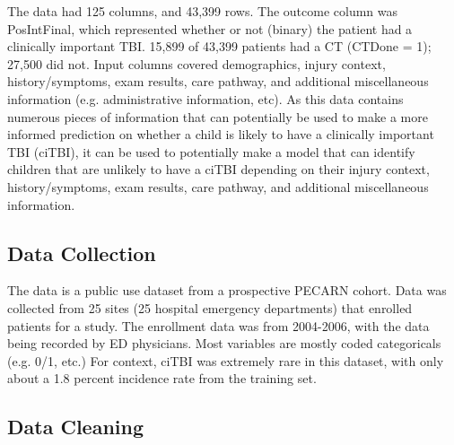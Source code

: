 \documentclass[10pt,letterpaper]{article}
\begin{document}
The data had 125 columns, and 43,399 rows. The outcome column was PosIntFinal, which represented whether or not (binary) the patient had a clinically important TBI.
15,899 of 43,399 patients had a CT (CTDone = 1); 27,500 did not.
Input columns covered demographics, injury context, history/symptoms, exam results, care pathway, and additional miscellaneous information (e.g. administrative information, etc).
As this data contains numerous pieces of information that can potentially be used to make a more informed prediction on whether a child is likely to have a clinically important TBI (ciTBI), it can be used to potentially make a model that can identify children that are unlikely to have a ciTBI depending on their injury context, history/symptoms, exam results, care pathway, and additional miscellaneous information.


\subsection{Data Collection}\label{data-collection}

The data is a public use dataset from a prospective PECARN cohort. Data was collected from 25 sites (25 hospital emergency departments) that enrolled patients for a study.
The enrollment data was from 2004-2006, with the data being recorded by ED physicians. 
Most variables are mostly coded categoricals (e.g. 0/1, etc.)
For context, ciTBI was extremely rare in this dataset, with only about a 1.8 percent incidence rate from the training set.


\subsection{Data Cleaning}\label{data-cleaning}
\end{document}
